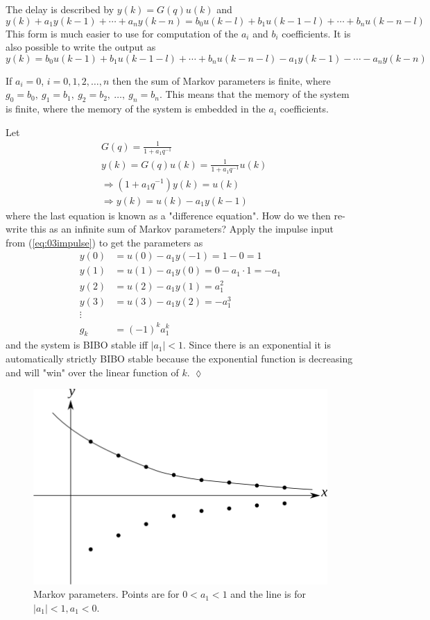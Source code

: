 \documentclass[lecture,12pt,]{pcms-l}
\begin{document}
The delay is described by $y(k) = G(q)u(k)$ and
$$y(k) + a_1y(k-1)+\cdots + a_ny(k-n) = b_0u(k-l)+b_1u(k-1-l) + \cdots + b_nu(k-n-l)$$
This form is much easier to use for computation of the $a_i$ and $b_i$ coefficients. It is also possible to write the output as
$$y(k) = b_0u(k-1) + b_1u(k-1-l) + \cdots + b_nu(k-n-l) - a_1y(k-1) - \cdots - a_ny(k-n)$$

If $a_i=0$, $i=0,1,2,\ldots,n$ then the sum of Markov parameters is finite, where $g_0=b_0, ~g_1=b_1, ~g_2=b_2, ~\ldots, ~g_n=b_n$. This means that the memory of the system is finite, where the memory of the system is embedded in the $a_i$ coefficients.

\begin{example}
Let
\begin{align*}
&G(q) = \frac{1}{1+a_1q^{-1}} \\
&y(k) = G(q)u(k) = \frac{1}{1+a_1q^{-1}}u(k) \\
&\Rightarrow (1+a_1q^{-1})y(k) = u(k) \\
&\Rightarrow y(k) = u(k) - a_1y(k-1)
\end{align*}
where the last equation is known as a "difference equation". How do we then re-write this as an infinite sum of Markov parameters? Apply the impulse input from (\ref{eq:03impulse}) to get the parameters as
\begin{align*}
y(0) &= u(0) - a_1y(-1) = 1-0 = 1 \\
y(1) &= u(1) - a_1y(0) = 0 - a_1 \cdot 1 = -a_1 \\
y(2) &= u(2) - a_1y(1) = a_1^2 \\
y(3) &= u(3) - a_1y(2) = -a_1^3 \\
\vdots & \\
g_k &= (-1)^ka_1^k
\end{align*}
and the system is BIBO stable iff $|a_1|<1$. Since there is an exponential it is automatically strictly BIBO stable because the exponential function is decreasing and will "win" over the linear function of $k$.
$\lozenge$
\end{example}
\begin{figure}[ht!]
	\centering
	\includegraphics[width=.5\textwidth]{images/03markovParams}
	\caption{Markov parameters. Points are for $0<a_1<1$ and the line is for $|a_1|<1, a_1<0$.}
	\label{fig:03markovParams}
\end{figure}
\end{document}
